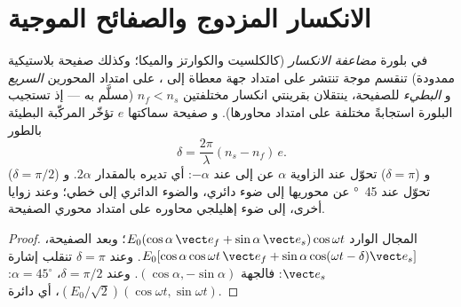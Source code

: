 \section{الانكسار المزدوج والصفائح الموجية}

\begin{proposition}\label{prop:b2:plane-waves-polarization:plates}
في بلورة \emph{مضاعفة الانكسار} (كالكلسيت والكوارتز والميكا؛ وكذلك
صفيحة بلاستيكية ممدودة) تنقسم موجة تنتشر على امتداد جهة معطاة
إلى ، على امتداد المحورين \emph{السريع} و
\emph{البطيء} للصفيحة، ينتقلان بقرينتي انكسار مختلفتين $n_f <
n_s$ (مسلَّم به --- إذ تستجيب البلورة استجابةً مختلفة على امتداد محاورها). و
صفيحة سماكتها $e$ تؤخّر المركّبة البطيئة بالطور
\[
\delta = \frac{2\pi}\lambda(n_s - n_f)\,e .
\]
و\emph{} ($\delta = \pi$) تحوّل  عند
الزاوية $\alpha$ عن  إلى  عند $-\alpha$: أي
تديره بالمقدار $2\alpha$. و\emph{} ($\delta = \pi/2$) تحوّل
 عند \qty{45}{\degree} عن محوريها إلى ضوء دائري،
والضوء الدائري إلى خطي؛ وعند زوايا أخرى، إلى ضوء
إهليلجي محاوره على امتداد محوري الصفيحة.
\end{proposition}

\begin{proof}
المجال الوارد $E_0(\cos\alpha\,\vect e_f + \sin\alpha\,\vect e_s)\cos\omega t$؛
وبعد الصفيحة، $E_0[\cos\alpha\cos\omega t\,\vect e_f + \sin\alpha\cos(\omega t - \delta)
\vect e_s]$. وعند $\delta = \pi$ تنقلب إشارة $\vect e_s$: فالجهة
$(\cos\alpha, -\sin\alpha)$. وعند $\delta = \pi/2$، $\alpha = 45^\circ$: $(E_0/\sqrt2)(\cos
\omega t, \sin\omega t)$، أي دائرة.
\end{proof}


